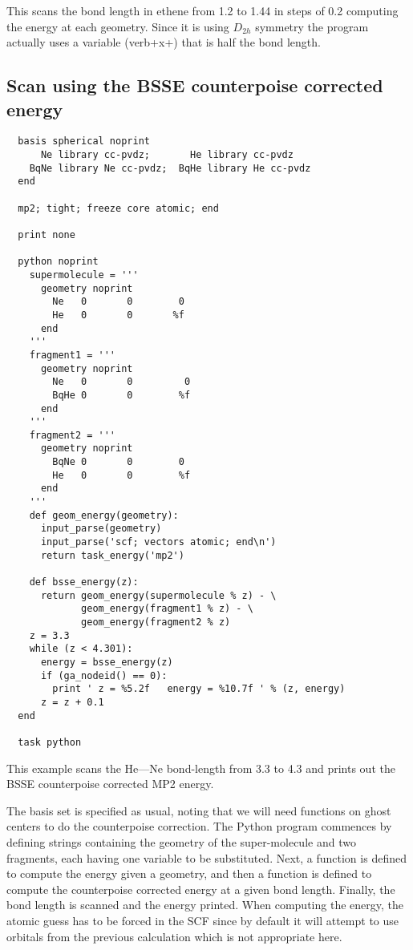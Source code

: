 This scans the bond length in ethene from 1.2 to 1.44 in steps 
of 0.2 computing the energy at each geometry.  Since it is using 
$D_{2h}$ symmetry the program actually uses a variable (verb+x+) that is
half the bond length.

\subsection{Scan using the BSSE counterpoise corrected energy}

\begin{verbatim}
  basis spherical noprint
      Ne library cc-pvdz;       He library cc-pvdz
    BqNe library Ne cc-pvdz;  BqHe library He cc-pvdz
  end

  mp2; tight; freeze core atomic; end

  print none

  python noprint
    supermolecule = '''
      geometry noprint
        Ne   0       0        0
        He   0       0       %f 
      end
    '''
    fragment1 = '''
      geometry noprint
        Ne   0       0         0
        BqHe 0       0        %f
      end
    '''
    fragment2 = '''
      geometry noprint
        BqNe 0       0        0
        He   0       0        %f
      end
    '''
    def geom_energy(geometry):
      input_parse(geometry)
      input_parse('scf; vectors atomic; end\n')
      return task_energy('mp2')

    def bsse_energy(z):
      return geom_energy(supermolecule % z) - \
             geom_energy(fragment1 % z) - \
             geom_energy(fragment2 % z)
    z = 3.3
    while (z < 4.301):
      energy = bsse_energy(z)
      if (ga_nodeid() == 0):
        print ' z = %5.2f   energy = %10.7f ' % (z, energy)
      z = z + 0.1
  end

  task python
\end{verbatim}

This example scans the He---Ne bond-length from 3.3 to 4.3 and prints out
the BSSE counterpoise corrected MP2 energy.

The basis set is specified as usual, noting that we will need
functions on ghost centers to do the counterpoise correction.  The
Python program commences by defining strings containing the geometry
of the super-molecule and two fragments, each having one variable to be
substituted.  Next, a function is defined to compute the energy given
a geometry, and then a function is defined to compute the counterpoise
corrected energy at a given bond length.  Finally, the bond length is
scanned and the energy printed.  When computing the energy, the atomic
guess has to be forced in the SCF since by default it will attempt to
use orbitals from the previous calculation which is not appropriate
here.

